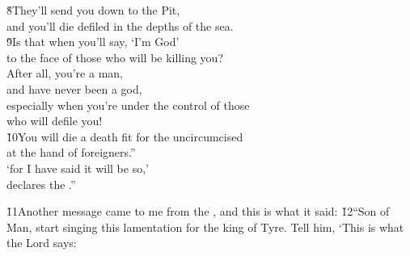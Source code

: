 \begin{poetry}
\poeml \v{8}They'll send you down to the Pit, \\
\poemll    and you'll die defiled in the depths of the sea. \\
\poeml \v{9}Is that when you'll say, `I'm God' \\
\poemll    to the face of those who will be killing you? \\
\poeml After all, you're a man, \\
\poemll    and have never been a god, \\
\poeml especially when you're under the control of those \\
\poemll    who will defile you! \\
\poeml \v{10}You will die a death fit for the uncircumcised \\
\poemll    at the hand of foreigners.'' \\
\poeml `for I have said it will be so,' \\
\poemll    declares the .''
\end{poetry}

\v{11}Another message came to me from the , and this is what it said: \v{12}``Son of Man, start singing this lamentation for the king of Tyre. Tell him, `This is what the Lord  says:

